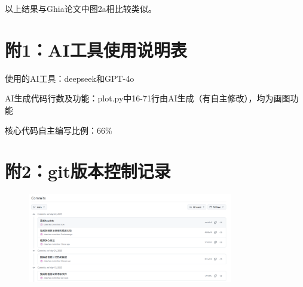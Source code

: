 \documentclass[12pt, a4paper]{article}
\begin{document}
以上结果与Ghia论文中图2a相比较类似。
\section*{附1：AI工具使用说明表}
使用的AI工具：deepseek和GPT-4o

AI生成代码行数及功能：plot.py中16-71行由AI生成（有自主修改），均为画图功能

核心代码自主编写比例：66\%

\section*{附2：git版本控制记录}
\begin{figure}[htbp]
    \centering
    \includegraphics[width=0.8\textwidth]{./pictures/git_control.png}
\end{figure}
\end{document}
